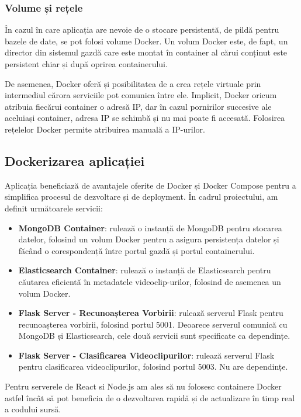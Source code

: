 \subsubsection{Volume și rețele}
\par
În cazul în care aplicația are nevoie de o stocare persistentă, de pildă pentru bazele de date, se pot
folosi volume Docker. Un volum Docker este, de fapt, un director din sistemul gazdă care este montat în
container al cărui conținut este persistent chiar și după oprirea containerului.

\par
De asemenea, Docker oferă și posibilitatea de a crea rețele virtuale prin intermediul cărora serviciile
pot comunica între ele. Implicit, Docker oricum atribuia fiecărui container o adresă IP, dar în cazul
pornirilor succesive ale aceluiași container, adresa IP se schimbă și nu mai poate fi accesată. Folosirea
rețelelor Docker permite atribuirea manuală a IP-urilor.

\subsection{Dockerizarea aplicației}
\par
Aplicația beneficiază de avantajele oferite de Docker și Docker Compose pentru a simplifica procesul
de dezvoltare și de deployment. În cadrul proiectului, am definit următoarele servicii:

\begin{itemize}
    \item \textbf{MongoDB Container}: rulează o instanță de MongoDB pentru stocarea datelor, folosind
    un volum Docker pentru a asigura persistența datelor și făcând o corespondență între portul gazdă
    și portul containerului.
    \item \textbf{Elasticsearch Container}: rulează o instanță de Elasticsearch pentru căutarea eficientă
    în metadatele videoclip-urilor, folosind de asemenea un volum Docker.
    \item \textbf{Flask Server - Recunoașterea Vorbirii}: rulează serverul Flask pentru recunoașterea
    vorbirii, folosind portul 5001. Deoarece serverul comunică cu MongoDB și Elasticsearch, cele două
    servicii sunt specificate ca dependințe.
    \item \textbf{Flask Server - Clasificarea Videoclipurilor}: rulează serverul Flask pentru clasificarea
    videoclipurilor, folosind portul 5003. Nu are dependințe.
\end{itemize}

\par
Pentru serverele de React si Node.js am ales să nu folosesc containere Docker astfel încât să pot
beneficia de o dezvoltarea rapidă și de actualizare în timp real a codului sursă.


